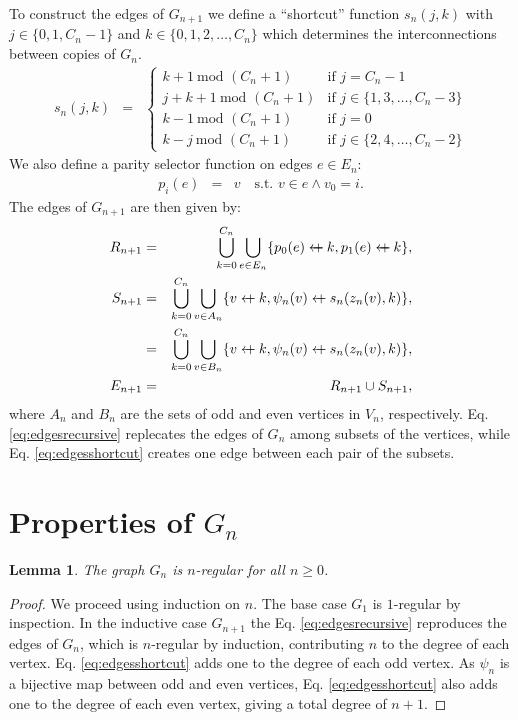 \documentclass{article}
\newcommand{\beq}{\begin{eqnarray}}
\newcommand{\eeq}{\end{eqnarray}}
\newcommand{\append}{\leftarrow{\mkern-18mu}{+}\:}
\newtheorem{lemma}{Lemma}
\begin{document}
To construct the edges of $G_{n+1}$ we define a ``shortcut'' function $s_n(j, k)$
with $j \in \{0, 1, C_n - 1\}$ and $k \in \{0, 1, 2, \ldots, C_n\}$ which
determines the interconnections between copies of $G_n$.
\beq
\label{eq:shortcut}
s_{n}(j, k)
&=&
\begin{cases}
k + 1 \ \mbox{mod } (C_n + 1)
&
\mbox{if } j = C_n - 1
\\
j + k + 1 \ \mbox{mod } (C_n + 1)
&
\mbox{if } j \in \{1, 3, \ldots, C_n - 3\} \\
k - 1 \ \mbox{mod } (C_n + 1)
&
\mbox{if } j = 0
\\
k - j \ \mbox{mod } (C_n + 1)
&
\mbox{if } j \in \{2, 4, \ldots, C_n - 2\}
\end{cases}
\eeq
We also define a parity selector function on edges $e \in E_n$:
\beq
p_i(e)
&=&
v \quad \mbox{s.t. } v \in e \land v_0 = i.
\eeq
The edges of $G_{n+1}$ are then given by:
\beq
\label{eq:edgesrecursive}
R_{n+1}
&=&
\bigcup_{k=0}^{C_n}
\bigcup_{e \in E_n} \{ p_0(e) \append k, p_1(e) \append k\},
\\
\label{eq:edgesshortcut}
S_{n+1}
&=&
\bigcup_{k=0}^{C_n}
\bigcup_{v \in A_n} \{ v \append k, \psi_n(v) \append s_n(z_n(v), k) \},
\\
&=&
\bigcup_{k=0}^{C_n}
\bigcup_{v \in B_n} \{ v \append k, \psi_n(v) \append s_n(z_n(v), k) \},
\\
E_{n+1}
&=&
R_{n+1} \cup S_{n+1},
\eeq
where $A_n$ and $B_n$ are the sets of odd and even vertices in $V_n$,
respectively.
Eq. \ref{eq:edgesrecursive} replecates the edges of
$G_n$ among subsets of the vertices,
while Eq. \ref{eq:edgesshortcut} creates one edge between each pair of the subsets.

\section{Properties of $G_n$}

\begin{lemma}
\label{lem:regular}
The graph $G_n$ is $n$-regular for all $n \geq 0$.
\end{lemma}
\begin{proof}
We proceed using induction on $n$.
The base case $G_1$ is $1$-regular by inspection.
In the inductive case $G_{n+1}$
the Eq. \ref{eq:edgesrecursive}
reproduces the edges of $G_n$,
which is $n$-regular by induction,
contributing $n$ to the degree of each vertex.
Eq. \ref{eq:edgesshortcut} adds one to the degree of each odd vertex.
As $\psi_n$ is a bijective map between odd and even vertices,
Eq. \ref{eq:edgesshortcut} also adds one to the degree of each even vertex,
giving a total degree of $n + 1$.
\end{proof}
\end{document}
